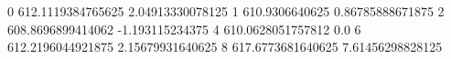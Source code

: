 0 612.1119384765625 2.04913330078125
1 610.9306640625 0.86785888671875
2 608.8696899414062 -1.193115234375
4 610.0628051757812 0.0
6 612.2196044921875 2.15679931640625
8 617.6773681640625 7.61456298828125
